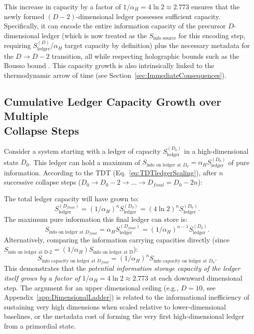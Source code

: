 \documentclass[a4paper, 12pt, oneside]{book}
\numberwithin{equation}{chapter}
\begin{document}
This increase in capacity by a factor of $1/\alpha_H = 4\ln 2 \approx 2.773$ ensures that the newly formed $(D-2)$-dimensional ledger possesses sufficient capacity. Specifically, it can encode the entire information capacity of the precursor $D$-dimensional ledger (which is now treated as the $S_{\text{info source}}$ for this encoding step, requiring $S_{\text{ledger}}^{(D)}/\alpha_H$ target capacity by definition) plus the necessary metadata for the $D \to D-2$ transition, all while respecting holographic bounds such as the Bousso bound \cite{Bousso1999}. This capacity growth is also intrinsically linked to the thermodynamic arrow of time (see Section~\ref{sec:ImmediateConsequences}).

\subsection[Cumulative Ledger Growth]{Cumulative Ledger Capacity Growth over Multiple \\ Collapse Steps}

Consider a system starting with a ledger of capacity $S_{\text{ledger}}^{(D_0)}$ in a high-dimensional state $D_0$. This ledger can hold a maximum of $S_{\text{info on ledger at }D_0} = \alpha_H S_{\text{ledger}}^{(D_0)}$ of pure information. According to the TDT (Eq.~\ref{eq:TDTledgerScaling}), after $n$ successive collapse steps ($D_0 \to D_0-2 \to \dots \to D_{final} = D_0-2n$):

The total ledger capacity will have grown to:
\[
    S_{\text{ledger}}^{(D_{final})} = (1/\alpha_H)^n S_{\text{ledger}}^{(D_0)} = (4\ln 2)^n S_{\text{ledger}}^{(D_0)}.
\]
The maximum pure information this final ledger can store is:
\[
    S_{\text{info on ledger at }D_{final}} = \alpha_H S_{\text{ledger}}^{(D_{final})} = (1/\alpha_H)^{n-1} S_{\text{ledger}}^{(D_0)}.
\]
Alternatively, comparing the information carrying capacities directly (since $S_{\text{info on ledger at D-2}} = (1/\alpha_H)S_{\text{info on ledger at D}}$):
\[
    S_{\text{info capacity on ledger at }D_{final}} = (1/\alpha_H)^n S_{\text{info capacity on ledger at }D_0}.
\]
This demonstrates that the \emph{potential information storage capacity of the ledger itself grows by a factor of $1/\alpha_H = 4\ln 2 \approx 2.773$} at each downward dimensional step. The argument for an upper dimensional ceiling (e.g., $D=10$, see Appendix~\ref{app:DimensionalLadder}) is related to the informational inefficiency of sustaining very high dimensions when scaled relative to lower-dimensional baselines, or the metadata cost of forming the very first high-dimensional ledger from a primordial state.
\end{document}
